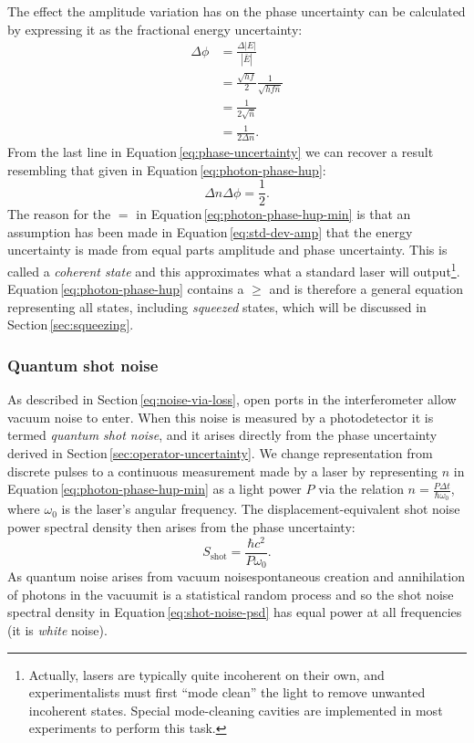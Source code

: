 The effect the amplitude variation has on the phase uncertainty can be calculated by expressing it as the fractional energy uncertainty:
\begin{equation}
  \label{eq:phase-uncertainty}
  \begin{split}
    \Delta \phi &= \frac{\Delta \left| E \right|}{\left| \bar{E} \right|} \\
                &= \frac{\sqrt{hf}}{2} \frac{1}{\sqrt{hf \bar{n}}} \\
                &= \frac{1}{2 \sqrt{\bar{n}}} \\
                &= \frac{1}{2 \Delta n}.
  \end{split}
\end{equation}
From the last line in Equation\,\ref{eq:phase-uncertainty} we can recover a result resembling that given in Equation\,\ref{eq:photon-phase-hup}:
\begin{equation}
  \label{eq:photon-phase-hup-min}
  \Delta n \Delta \phi = \frac{1}{2}.
\end{equation}
The reason for the $=$ in Equation\,\ref{eq:photon-phase-hup-min} is that an assumption has been made in Equation\,\ref{eq:std-dev-amp} that the energy uncertainty is made from equal parts amplitude and phase uncertainty. This is called a \emph{coherent state} and this approximates what a standard laser will output\footnote{Actually, lasers are typically quite incoherent on their own, and experimentalists must first ``mode clean'' the light to remove unwanted incoherent states. Special mode-cleaning cavities are implemented in most experiments to perform this task.}. Equation\,\ref{eq:photon-phase-hup} contains a $\geq$ and is therefore a general equation representing all states, including \emph{squeezed} states, which will be discussed in Section\,\ref{sec:squeezing}.

\subsubsection{Quantum shot noise}
As described in Section\,\ref{eq:noise-via-loss}, open ports in the interferometer allow vacuum noise to enter. When this noise is measured by a photodetector it is termed \emph{quantum shot noise}, and it arises directly from the phase uncertainty derived in Section\,\ref{sec:operator-uncertainty}. We change representation from discrete pulses to a continuous measurement made by a laser by representing $n$ in Equation\,\ref{eq:photon-phase-hup-min} as a light power $P$ via the relation $n = \frac{P \Delta t}{\hbar \omega_0}$, where $\omega_0$ is the laser's angular frequency. The displacement-equivalent shot noise power spectral density then arises from the phase uncertainty:
\begin{equation}
  \label{eq:shot-noise-psd}
  S_{\text{shot}} = \frac{\hbar c^2}{P \omega_0}.
\end{equation}
As quantum noise arises from vacuum noise\textemdash spontaneous creation and annihilation of photons in the vacuum\textemdash it is a statistical random process and so the shot noise spectral density in Equation\,\ref{eq:shot-noise-psd} has equal power at all frequencies (it is \emph{white} noise).


